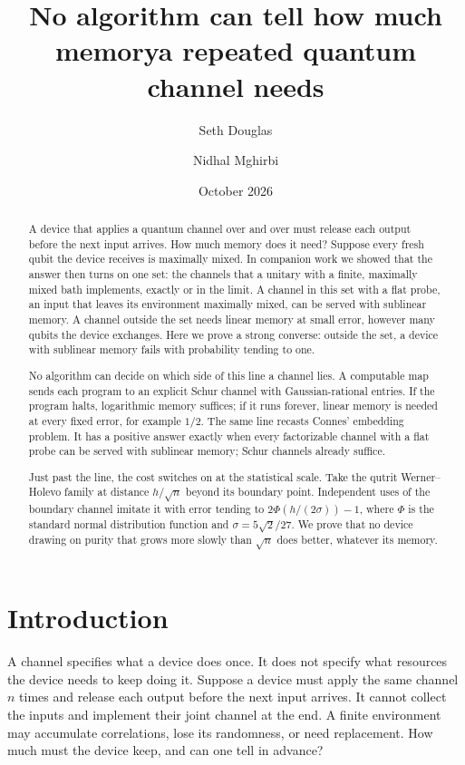 \documentclass[11pt]{article}
\title{No algorithm can tell how much memory\newline a repeated quantum channel needs}
\author{Seth Douglas \and Nidhal Mghirbi}
\date{October 2026}
\theoremstyle{definition}
\theoremstyle{remark}
\begin{document}
\maketitle
\begin{abstract}
A device that applies a quantum channel over and over must release each output before the next input arrives. How much memory does it need? Suppose every fresh qubit the device receives is maximally mixed. In companion work we showed that the answer then turns on one set: the channels that a unitary with a finite, maximally mixed bath implements, exactly or in the limit. A channel in this set with a flat probe, an input that leaves its environment maximally mixed, can be served with sublinear memory. A channel outside the set needs linear memory at small error, however many qubits the device exchanges. Here we prove a strong converse: outside the set, a device with sublinear memory fails with probability tending to one.

No algorithm can decide on which side of this line a channel lies. A computable map sends each program to an explicit Schur channel with Gaussian-rational entries. If the program halts, logarithmic memory suffices; if it runs forever, linear memory is needed at every fixed error, for example $1/2$. The same line recasts Connes' embedding problem. It has a positive answer exactly when every factorizable channel with a flat probe can be served with sublinear memory; Schur channels already suffice.

Just past the line, the cost switches on at the statistical scale. Take the qutrit Werner--Holevo family at distance $h/\sqrt n$ beyond its boundary point. Independent uses of the boundary channel imitate it with error tending to $2\Phi(h/(2\sigma))-1$, where $\Phi$ is the standard normal distribution function and $\sigma=5\sqrt2/27$. We prove that no device drawing on purity that grows more slowly than $\sqrt n$ does better, whatever its memory.
\end{abstract}

\section{Introduction}\label{sec:intro}

A channel specifies what a device does once. It does not specify what resources the device needs to keep doing it. Suppose a device must apply the same channel $n$ times and release each output before the next input arrives. It cannot collect the inputs and implement their joint channel at the end. A finite environment may accumulate correlations, lose its randomness, or need replacement. How much must the device keep, and can one tell in advance?
\end{document}
